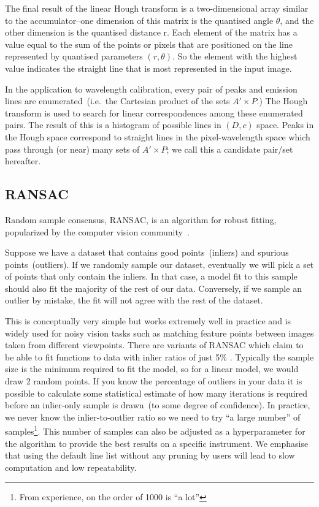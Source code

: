 \documentclass[fleqn,usenatbib]{rasti}
\begin{document}
The final result of the linear Hough transform is a two-dimensional array similar
to the accumulator--one dimension of this matrix is the quantised angle $\theta$,
and the other dimension is the quantised distance r. Each element of the matrix has
a value equal to the sum of the points or pixels that are positioned on the line
represented by quantised parameters $(r, \theta)$. So the element with the highest
value indicates the straight line that is most represented in the input image.

In the application to wavelength calibration, every pair of peaks and emission
lines are enumerated~(i.e.\ the Cartesian product of the sets $A' \times P$.)
The Hough transform is used to search for linear correspondences among these
enumerated pairs. The result of this is a histogram of possible lines in
$(D, c)$ space. Peaks in the Hough space correspond to straight lines in the
pixel-wavelength space which pass through (or near) many sets of $A' \times P$;
we call this a candidate pair/set hereafter.

\subsection{RANSAC}
Random sample consensus, RANSAC, is an algorithm for robust fitting,
popularized by the computer vision community~\citep{fischler_bolles_1981}.

Suppose we have a dataset that contains good points~(inliers) and spurious
points~(outliers). If we randomly sample our dataset, eventually we will
pick a set of points that only contain the inliers. In that case, a model
fit to this sample should also fit the majority of the rest of our data.
Conversely, if we sample an outlier by mistake, the fit will not agree with
the rest of the dataset.

This is conceptually very simple but works extremely well in practice and is
widely used for noisy vision tasks such as matching feature points between images
taken from different viewpoints. There are variants of RANSAC which claim to be
able to fit functions to data with inlier ratios of just 5\%
\citep{hast_optimal_ransac}. Typically the sample size is the minimum required
to fit the model, so for a linear model, we would draw 2 random points. If you
know the percentage of outliers in your data it is possible to calculate some
statistical estimate of how many iterations is required before an inlier-only
sample is drawn~(to some degree of confidence). In practice, we never know the
inlier-to-outlier ratio so we need to try ``a large number'' of
samples\footnote{From experience, on the order of 1000 is ``a lot''}. This number
of samples can also be adjusted as  a hyperparameter for the algorithm to provide
the best results on a specific instrument. We emphasise that using the default
line list without any pruning by users will lead to slow computation and low
repeatability.
\end{document}
